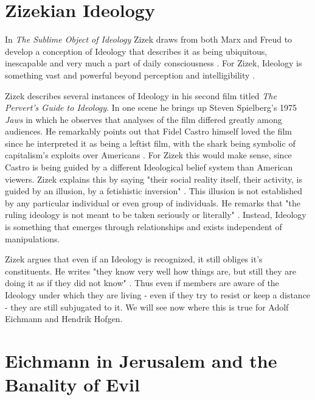 \documentclass[a4paper, 11pt]{article} %
\begin{document}

\section*{Zizekian Ideology}

In \textit{The Sublime Object of Ideology} Zizek draws from both Marx and Freud to develop a conception of Ideology that describes it as being ubiquitous, inescapable and very much a part of daily consciousness \cite{Zizek}.  For Zizek, Ideology is something vast and powerful beyond perception and intelligibility \cite{Zizek}.  

Zizek describes several instances of Ideology in his second film titled \textit{The Pervert's Guide to Ideology}.  In one scene he brings up Steven Spielberg's 1975 \textit{Jaws} in which he observes that analyses of the film differed greatly among audiences.  He remarkably points out that Fidel Castro himself loved the film since he interpreted it as being a leftist film, with the shark being symbolic of capitalism's exploits over Americans \cite{FiennesFilm}.  For Zizek this would make sense, since Castro is being guided by a different Ideological belief system than American viewers.  Zizek explains this by saying "their social reality itself, their activity, is guided by an illusion, by a fetishistic inversion" \cite{Zizek}.  This illusion is not established by any particular individual or even group of individuals.  He remarks that "the ruling ideology is not meant to be taken seriously or literally" \cite{Zizek}.  Instead, Ideology is something that emerges through relationships and exists independent of manipulations.  

Zizek argues that even if an Ideology is recognized, it still obliges it's constituents.  He writes "they know very well how things are, but still they are doing it as if they did not know" \cite{Zizek}.  Thus even if members are aware of the Ideology under which they are living - even if they try to resist or keep a distance - they are still subjugated to it.  We will see now where this is true for Adolf Eichmann and Hendrik Hofgen.  


\section*{Eichmann in Jerusalem and the Banality of Evil}
\end{document}
